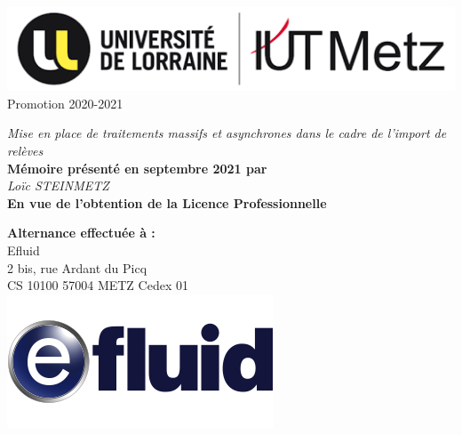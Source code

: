 \documentclass[a4paper, 12pt]{report}
\begin{document}
\renewcommand \partname{\thispagestyle{empty}}
\doparttoc


\thispagestyle{empty}
\begin{center}  
\begin{multicols}{2}
  \flushleft
  \null
  \includegraphics[width=\columnwidth]{../res/logo-iut.png}
  \flushright
  \null
  \vspace{0.3cm}
  \large{Promotion 2020-2021}
\end{multicols}
\vspace{2cm}
\LARGE{\textit{Mise en place de traitements massifs et asynchrones dans le cadre de l'import de relèves}}\\
\vspace{2cm}
\large{\textbf{Mémoire présenté en septembre 2021 par}}\\
\vspace{0.5cm}
\Large{\textit{Loïc STEINMETZ}}\\
\vspace{2cm}
\large{\textbf{En vue de l'obtention de la Licence Professionnelle}}\\
\vspace{0.5cm}
\vspace{2.8cm}
\begin{multicols}{2}
  \flushleft
  \null
  \textbf{Alternance effectuée à :}\\
  Efluid\\
  2 bis, rue Ardant du Picq\\
  CS 10100 57004 METZ Cedex 01\\
  \flushright
  \null
  \includegraphics[width=.6\columnwidth]{../res/logo-efluid.jpg}
\end{multicols}
\end{center}
\end{document}
